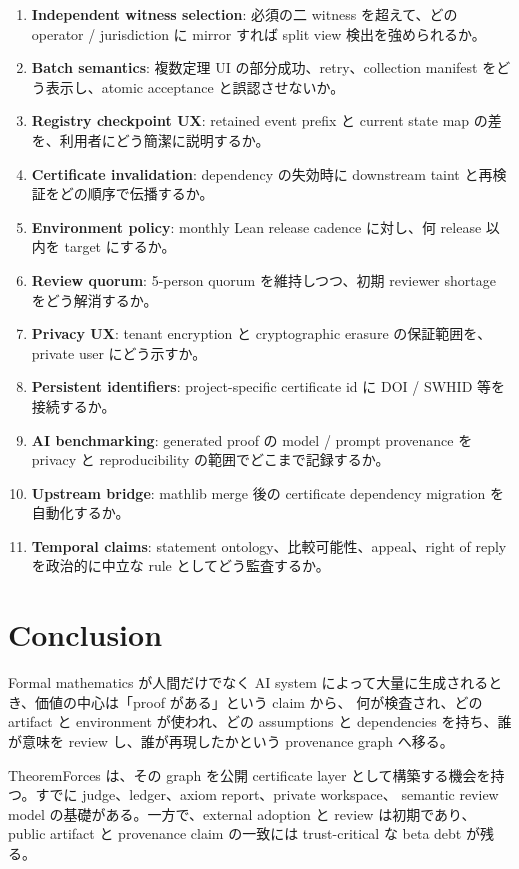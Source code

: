 \documentclass[a4paper,11pt]{ltjsarticle}
\newcommand{\term}[1]{\textbf{\color{TFNavy}#1}}
\begin{document}
\begin{enumerate}
  \item \term{Independent witness selection}: 必須の二 witness を超えて、どの operator / jurisdiction に mirror すれば split view 検出を強められるか。
  \item \term{Batch semantics}: 複数定理 UI の部分成功、retry、collection manifest をどう表示し、atomic acceptance と誤認させないか。
  \item \term{Registry checkpoint UX}: retained event prefix と current state map の差を、利用者にどう簡潔に説明するか。
  \item \term{Certificate invalidation}: dependency の失効時に downstream taint と再検証をどの順序で伝播するか。
  \item \term{Environment policy}: monthly Lean release cadence に対し、何 release 以内を target にするか。
  \item \term{Review quorum}: 5-person quorum を維持しつつ、初期 reviewer shortage をどう解消するか。
  \item \term{Privacy UX}: tenant encryption と cryptographic erasure の保証範囲を、private user にどう示すか。
  \item \term{Persistent identifiers}: project-specific certificate id に DOI / SWHID 等を接続するか。
  \item \term{AI benchmarking}: generated proof の model / prompt provenance を privacy と reproducibility の範囲でどこまで記録するか。
  \item \term{Upstream bridge}: mathlib merge 後の certificate dependency migration を自動化するか。
  \item \term{Temporal claims}: statement ontology、比較可能性、appeal、right of reply を政治的に中立な rule としてどう監査するか。
\end{enumerate}

\section{Conclusion}

Formal mathematics が人間だけでなく AI system によって大量に生成されるとき、価値の中心は「proof がある」という claim から、
何が検査され、どの artifact と environment が使われ、どの assumptions と dependencies を持ち、誰が意味を review し、誰が再現したかという
provenance graph へ移る。

TheoremForces は、その graph を公開 certificate layer として構築する機会を持つ。すでに judge、ledger、axiom report、private workspace、
semantic review model の基礎がある。一方で、external adoption と review は初期であり、public artifact と provenance claim の一致には
trust-critical な beta debt が残る。
\end{document}
